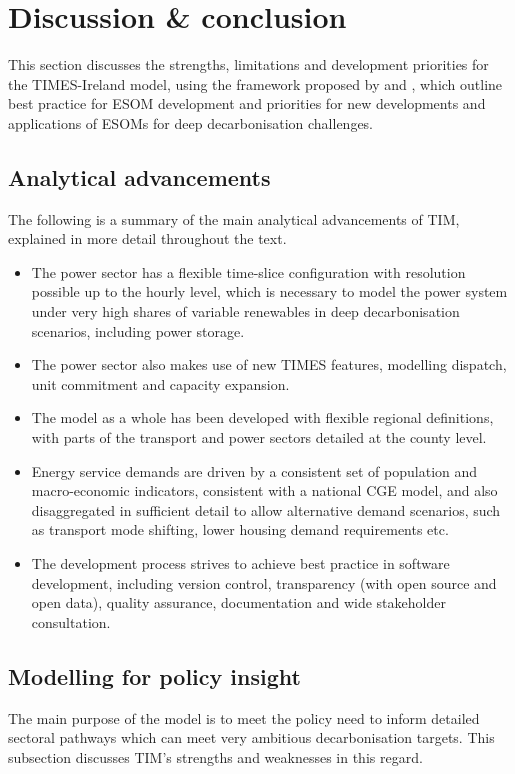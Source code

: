 \documentclass[gmd,manuscript]{copernicus}
\begin{document}
\section{Discussion \& conclusion}
\label{s:discussion}
This section discusses the strengths, limitations and development priorities for the TIMES-Ireland model, using the framework proposed by \citet{Pye2020} and \citet{DeCarolis2017}, which outline best practice for ESOM development and priorities for new developments and applications of ESOMs for deep decarbonisation challenges.

\subsection{Analytical advancements}
The following is a summary of the main analytical advancements of TIM, explained in more detail throughout the text. 
\begin{itemize}
\item The power sector has a flexible time-slice configuration with resolution possible up to the hourly level, which is necessary to model the power system under very high shares of variable renewables in deep decarbonisation scenarios, including power storage. 
\item The power sector also makes use of new TIMES features, modelling dispatch, unit commitment and capacity expansion.
\item The model as a whole has been developed with flexible regional definitions, with parts of the transport and power sectors detailed at the county level. 
\item Energy service demands are driven by a consistent set of population and macro-economic indicators, consistent with a national CGE model, and also disaggregated in sufficient detail to allow alternative demand scenarios, such as transport mode shifting, lower housing demand requirements etc.
\item The development process strives to achieve best practice in software development, including version control, transparency (with open source and open data), quality assurance, documentation and wide stakeholder consultation. 
\end{itemize}

\subsection{Modelling for policy insight}
The main purpose of the model is to meet the policy need to inform detailed sectoral pathways which can meet very ambitious decarbonisation targets. This subsection discusses TIM's strengths and weaknesses in this regard. 
\end{document}
